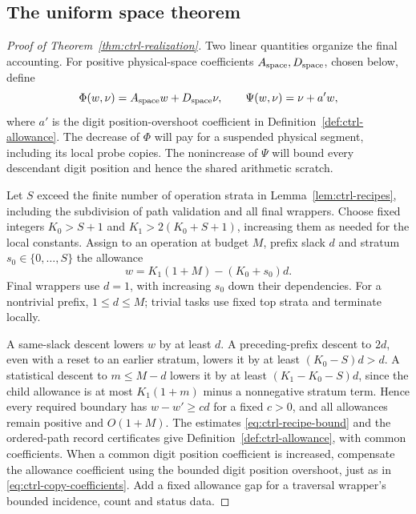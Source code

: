 \subsection{The uniform space theorem}\label{sec:ctrl-space}

\begin{proof}[Proof of Theorem~\ref{thm:ctrl-realization}]
Two linear quantities organize the final accounting.  For positive
physical-space coefficients $A_{\rm space},D_{\rm space}$, chosen below, define
\begin{equation}\label{eq:ctrl-potentials}
 \Phi(w,\nu)=A_{\rm space}w+D_{\rm space}\nu,\qquad \Psi(w,\nu)=\nu+a'w,
\end{equation}
where $a'$ is the digit position-overshoot coefficient in
Definition~\ref{def:ctrl-allowance}.  The decrease of $\Phi$ will pay for
a suspended physical segment, including its local probe copies.
The nonincrease of $\Psi$ will bound every descendant digit position
and hence the shared arithmetic scratch.

Let $S$ exceed the finite number of operation strata in
Lemma~\ref{lem:ctrl-recipes}, including the subdivision of path
validation and all final wrappers.  Choose fixed integers
$K_0>S+1$ and $K_1>2(K_0+S+1)$, increasing them as needed for the
local constants.  Assign to an operation at budget $M$, prefix slack
$d$ and stratum $s_0\in\{0,\ldots,S\}$ the allowance
\begin{equation}\label{eq:ctrl-allowance-formula}
 w=K_1(1+M)-(K_0+s_0)d.
\end{equation}
Final wrappers use $d=1$, with increasing $s_0$ down their dependencies.
For a nontrivial prefix, $1\le d\le M$; trivial tasks use fixed top
strata and terminate locally.

A same-slack descent lowers $w$ by at least $d$.  A preceding-prefix
descent to $2d$, even with a reset to an earlier stratum, lowers it by
at least $(K_0-S)d>d$.  A statistical descent to $m\le M-d$ lowers it
by at least $(K_1-K_0-S)d$, since the child allowance is at most
$K_1(1+m)$ minus a nonnegative stratum term.  Hence every required
boundary has $w-w'\ge c d$ for a fixed $c>0$, and all allowances remain
positive and $O(1+M)$.  The estimates
\eqref{eq:ctrl-recipe-bound} and the ordered-path record certificates
give Definition~\ref{def:ctrl-allowance}, with common coefficients.
When a common digit position coefficient is increased, compensate the allowance
coefficient using the bounded digit position overshoot, just as in
\eqref{eq:ctrl-copy-coefficients}.  Add a fixed allowance gap for a
traversal wrapper's bounded incidence, count and status data.


\end{proof}
